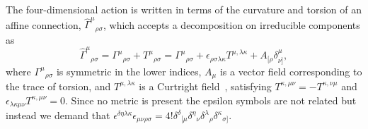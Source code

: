 \documentclass[aps,prl,twocolumn,superscriptaddress,showpacs,showkeys]{revtex4-1}
\begin{document}
The four-dimensional action is written in terms of the curvature and torsion of an affine connection, $\hat{\Gamma}^\mu{}_{\rho\sigma}$, which accepts a decomposition on irreducible components as
\begin{equation}
  \hat{\Gamma}^\mu{}_{\rho\sigma} = {\Gamma}^\mu{}_{\rho\sigma} + T^\mu{}_{\rho\sigma} = {\Gamma}^\mu{}_{\rho\sigma} + \epsilon_{\rho\sigma\lambda\kappa}T^{\mu,\lambda\kappa}+A_{[\rho}\delta^\mu_{\nu]},
\end{equation}
where ${\Gamma}^\mu{}_{\rho\sigma}$ is symmetric in the lower indices, $A_\mu$ is a vector field corresponding to the trace of torsion, and  $T^{\mu,\lambda\kappa}$ is a Curtright field~\cite{Curtright:1980yk}, satisfying $T^{\kappa,\mu\nu } = - T^{\kappa,\nu\mu }$ and $\epsilon_{\lambda\kappa\mu\nu}T^{\kappa,\mu\nu }=0$. Since no metric is present  the epsilon symbols are not related but instead we demand that \mbox{$\epsilon^{\delta\eta\lambda\kappa}\epsilon_{\mu\nu\rho\sigma}=4!\delta^{\delta}{}_{[\mu}\delta^\eta{}_{\nu}\delta^{\lambda}{}_{\rho} \delta^\kappa{}_{\sigma]}$.}
\end{document}
